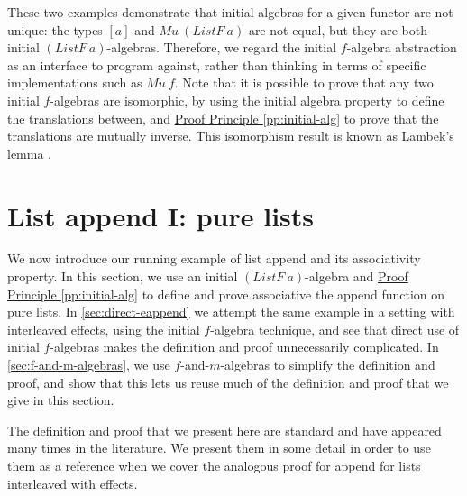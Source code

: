 \documentclass{jfp1}
\newcommand{\proofprinref}[1]{\hyperref[#1]{Proof Principle \ref*{#1}}}
\begin{document}
These two examples demonstrate that initial algebras for a given
functor are not unique: the types $[a]$ and
$\mathit{Mu}~(\mathit{ListF}~a)$ are not equal, but they are both
initial $(\mathit{ListF}~a)$-algebras. Therefore, we regard the
initial $f$-algebra abstraction as an interface to program against,
rather than thinking in terms of specific implementations such as
$\mathit{Mu}~f$. Note that it is possible to prove that any two
initial $f$-algebras are isomorphic, by using the initial algebra
property to define the translations between, and
\proofprinref{pp:initial-alg} to prove that the translations are
mutually inverse. This isomorphism result is known as Lambek's lemma
\cite{LAMBEK68}.

\section{List append I: pure lists}
\label{sec:pure-append}

We now introduce our running example of list append and its
associativity property. In this section, we use an initial
$(\mathit{ListF}~a)$-algebra and \proofprinref{pp:initial-alg} to
define and prove associative the append function on pure lists. In
\autoref{sec:direct-eappend} we attempt the same example in a setting
with interleaved effects, using the initial $f$-algebra technique, and
see that direct use of initial $f$-algebras makes the definition and
proof unnecessarily complicated. In \autoref{sec:f-and-m-algebras}, we
use $f$-and-$m$-algebras to simplify the definition and proof, and
show that this lets us reuse much of the definition and proof that we
give in this section.

The definition and proof that we present here are standard and have
appeared many times in the literature. We present them in some detail
in order to use them as a reference when we cover the analogous proof
for append for lists interleaved with effects.
\end{document}
